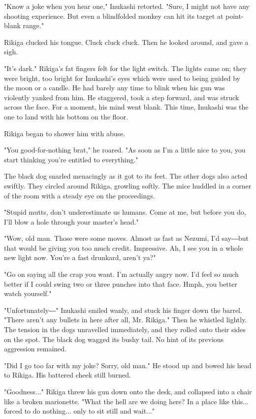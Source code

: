"Know a joke when you hear one," Inukashi retorted. "Sure, I might not
have any shooting experience. But even a blindfolded monkey can hit its
target at point-blank range."

Rikiga clucked his tongue. Cluck cluck cluck. Then he looked around, and
gave a sigh.

"It's dark." Rikiga's fat fingers felt for the light switch. The lights
came on; they were bright, too bright for Inukashi's eyes which were
used to being guided by the moon or a candle. He had barely any time to
blink when his gun was violently yanked from him. He staggered, took a
step forward, and was struck across the face. For a moment, his mind
went blank. This time, Inukashi was the one to land with his bottom on
the floor.

Rikiga began to shower him with abuse.

"You good-for-nothing brat," he roared. "As soon as I'm a little nice to
you, you start thinking you're entitled to everything."

The black dog snarled menacingly as it got to its feet. The other dogs
also acted swiftly. They circled around Rikiga, growling softly. The
mice huddled in a corner of the room with a steady eye on the
proceedings.

"Stupid mutts, don't underestimate us humans. Come at me, but before you
do, I'll blow a hole through your master's head."

"Wow, old man. Those were some moves. Almost as fast as Nezumi, I'd
say―but that would be giving you too much credit. Impressive. Ah, I see
you in a whole new light now. You're a fast drunkard, aren't ya?"

"Go on saying all the crap you want. I'm actually angry now. I'd feel so
much better if I could swing two or three punches into that face. Hmph,
you better watch yourself."

"Unfortunately―" Inukashi smiled wanly, and stuck his finger down the
barrel. "There aren't any bullets in here after all, Mr. Rikiga." Then
he whistled lightly. The tension in the dogs unravelled immediately, and
they rolled onto their sides on the spot. The black dog wagged its bushy
tail. No hint of its previous aggression remained.

"Did I go too far with my joke? Sorry, old man." He stood up and bowed
his head to Rikiga. His battered cheek still burned.

"Goodness..." Rikiga threw his gun down onto the desk, and collapsed
into a chair like a broken marionette. "What the hell are we doing here?
In a place like this... forced to do nothing... only to sit still and
wait..."


